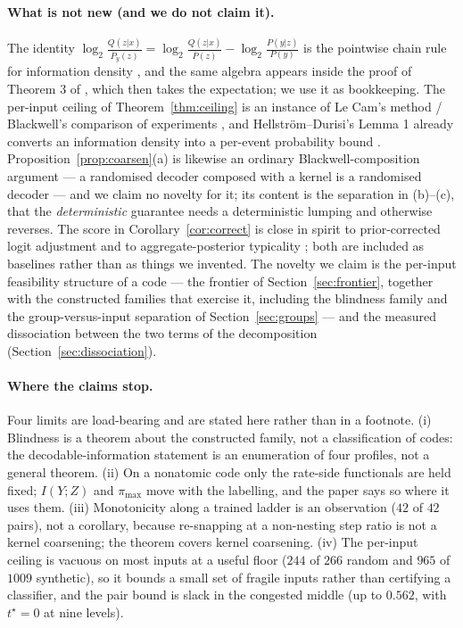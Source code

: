 \documentclass[11pt]{article}
\begin{document}
\paragraph{What is not new (and we do not claim it).}
The identity
$\log_2\frac{Q(z|x)}{\bar P_y(z)}=\log_2\frac{Q(z|x)}{\bar P(z)}-\log_2\frac{P(y|z)}{P(y)}$
is the pointwise chain rule for information density \citep{hellstrom2021,verdu2012}, and the same
algebra appears inside the proof of Theorem 3 of \citet{structured2026}, which then takes the
expectation; we use it as bookkeeping. The per-input ceiling of Theorem~\ref{thm:ceiling} is an
instance of Le Cam's method / Blackwell's comparison of experiments
\citep{raginsky2011,torgersen1991}, and Hellstr\"om--Durisi's Lemma 1 already converts an
information density into a per-event probability bound \citep{hellstrom2021}.
Proposition~\ref{prop:coarsen}(a) is likewise an ordinary Blackwell-composition argument --- a
randomised decoder composed with a kernel is a randomised decoder --- and we claim no novelty for
it; its content is the separation in (b)--(c), that the \emph{deterministic} guarantee needs a
deterministic lumping and otherwise reverses. The score in
Corollary~\ref{cor:correct} is close in spirit to prior-corrected logit adjustment
\citep{menon2021} and to aggregate-posterior typicality \citep{typicality2019}; both are included
as baselines rather than as things we invented. The novelty we claim is the per-input feasibility
structure of a code --- the frontier of Section~\ref{sec:frontier}, together with the constructed
families that exercise it, including the blindness family and the group-versus-input separation
of Section~\ref{sec:groups} --- and the measured dissociation between the two terms of the
decomposition (Section~\ref{sec:dissociation}).

\paragraph{Where the claims stop.} Four limits are load-bearing and are stated here rather than in
a footnote. (i) Blindness is a theorem about the constructed family, not a classification of
codes: the decodable-information statement is an enumeration of four profiles, not a general
theorem. (ii) On a nonatomic code only the rate-side functionals are held fixed; $I(Y;Z)$ and
$\pi_{\max}$ move with the labelling, and the paper says so where it uses them. (iii) Monotonicity
along a trained ladder is an observation ($42$ of $42$ pairs), not a corollary, because re-snapping
at a non-nesting step ratio is not a kernel coarsening; the theorem covers kernel coarsening. (iv)
The per-input ceiling is vacuous on most inputs at a useful floor ($244$ of $266$ random and $965$
of $1009$ synthetic), so it bounds a small set of fragile inputs rather than certifying a
classifier, and the pair bound is slack in the congested middle (up to $0.562$, with $t^\star=0$ at
nine levels).
\end{document}
